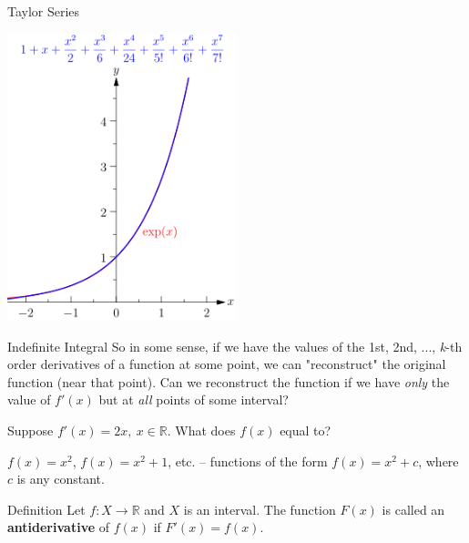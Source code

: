 \documentclass{beamer}
\newcommand{\R}{\mathbb{R}}
\begin{document}
\begin{frame}{Taylor Series}
      \begin{center}

    \includegraphics[width=0.5\textwidth, height=\textheight, keepaspectratio]{Mfnf-exp-series-imageonline.co-60931-9.png}
  \end{center}
    
\end{frame}




\begin{frame}{Indefinite Integral}
     So in some sense, if we have the values of the 1st, 2nd, ..., \textit{k}-th order derivatives of a function at some point, we can "reconstruct" the original function (near that point). \pause Can we reconstruct the function if we have \textit{only} the value of $f'(x)$ but at \textit{all} points of some interval?
     \vspace{0.3cm}

\pause
{\color{blue}{Question:}}         Suppose $f'(x)=2x, \: x\in\R$. What does $f(x)$ equal to?

     
     \pause

     {\color{blue}{Answer:}}         $f(x)=x^2$, $f(x)=x^2+1$, etc. -- functions of the form $f(x)=x^2+c$, where $c$ is any constant.
     \pause 
     
       \begin{block}{Definition}
        Let $f:X\to \R$ and $X$ is an interval. The function $F(x)$ is called an \textbf{antiderivative} of $f(x)$ if $F'(x) = f(x)$.
    \end{block}

\end{frame}
\end{document}
